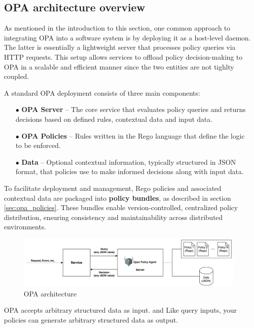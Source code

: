 \subsection{OPA architecture overview}

As mentioned in the introduction to this section, one common approach to integrating OPA into a software system is by deploying it as a host-level daemon. The latter is essentially a lightweight server that processes policy queries via HTTP requests. This setup allows services to offload policy decision-making to OPA in a scalable and efficient manner since the two entities are not tighlty coupled.

A standard OPA deployment consists of three main components:

\begin{itemize}[itemsep=0.2pt, topsep=1pt]
\item[$\bullet$] \textbf{OPA Server} – The core service that evaluates policy queries and returns decisions based on defined rules, contextual data and input data.
\item[$\bullet$] \textbf{OPA Policies} – Rules written in the Rego language that define the logic to be enforced.
\item[$\bullet$] \textbf{Data} – Optional contextual information, typically structured in JSON format, that policies use to make informed decisions along with input data.
\end{itemize}

To facilitate deployment and management, Rego policies and associated contextual data are packaged into \textbf{policy bundles}, as described in section \ref{sec:opa_policies}. These bundles enable version-controlled, centralized policy distribution, ensuring consistency and maintainability across distributed environments. \newline


\begin{figure}[htb]
\centering
\includegraphics[width=1\linewidth]{images/OPA.png}
\caption{OPA architecture}
\label{fig:opa_architecture}
\end{figure}


OPA accepts arbitrary structured data as input.
and  Like query inputs, your policies can generate arbitrary structured data as output.

